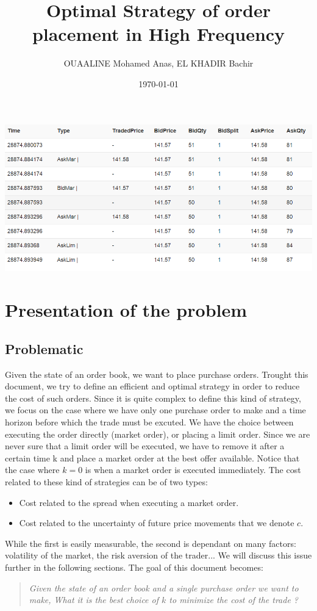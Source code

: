 \documentclass{article}
\title{Optimal Strategy of order placement in High Frequency  }
\author{OUAALINE Mohamed Anas, EL KHADIR Bachir}
\date \today
\begin{document}
\maketitle

\includegraphics[scale=0.75]{img/donnees.png}

\tableofcontents

\section{Presentation of the problem}

\subsection{Problematic}
Given the state of an order book, we want to place purchase orders. Trought this document, we try to define an efficient and optimal strategy in order to reduce the cost of such orders. Since it is quite complex to define this kind of strategy, we focus on the case where we have only one purchase order to make and a time horizon before which the trade must be excuted. We have the choice between executing the order directly (market order), or placing a limit order. Since we are never sure that a limit order will be executed, we have to remove it after a certain time k and place a market order at the best offer available. Notice that the case where $k = 0$ is when a market order is executed immediately.
The cost related to these kind of strategies can be of two types:

\begin{itemize}
	\item Cost related to the spread when executing a market order.
	\item Cost related to the uncertainty of future price movements that we denote $c$.
\end{itemize}
While the first is easily measurable, the second is dependant on many factors: volatility of the market, the risk aversion of the trader... 
We will discuss this issue further in the following sections.
The goal of this document becomes:
\begin{quote}
\textit{Given the state of an order book and a single purchase order we want to make, What it is the best choice of $k$ to minimize the cost of the trade  ?}
\end{quote}
\end{document}
